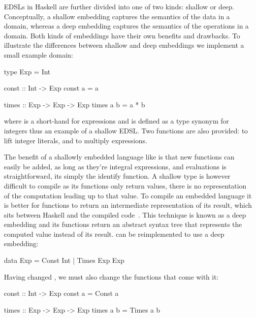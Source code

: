 \documentclass[../paper.tex]{subfiles}
\begin{document}
EDSLs in Haskell are further divided into one of two kinds: shallow or deep. Conceptually, a shallow embedding captures the semantics of the data in a domain, whereas a deep embedding captures the semantics of the operations in a domain. Both kinds of embeddings have their own benefits and drawbacks. To illustrate the differences between shallow and deep embeddings we implement a small example domain:

\begin{code}
type Exp = Int

const :: Int -> Exp
const a = a

times :: Exp -> Exp -> Exp
times a b = a * b
\end{code}

\noindent where  is a short-hand for expressions and is defined as a type synonym for integers thus an example of a shallow EDSL. Two functions are also provided:  to lift integer literals, and  to multiply expressions.

The benefit of a shallowly embedded language like  is that new functions can easily be added, as long as they're integral expressions, and evaluations is straightforward, its simply the identify function. A shallow type is however difficult to compile as its functions only return values, there is no representation of the computation leading up to that value. To compile an embedded language it is better for functions to return an intermediate representation of its result, which sits between Haskell and the compiled code~\cite{elliott2003}. This technique is known as a deep embedding and its functions return an abstract syntax tree that represents the computed value instead of its result.  can be reimplemented to use a deep embedding:

\begin{code}
data Exp = Const Int | Times Exp Exp
\end{code}


Having changed , we must also change the functions that come with it:

\begin{code}
const :: Int -> Exp
const a = Const a

times :: Exp -> Exp -> Exp
times a b = Times a b
\end{code}
\end{document}
